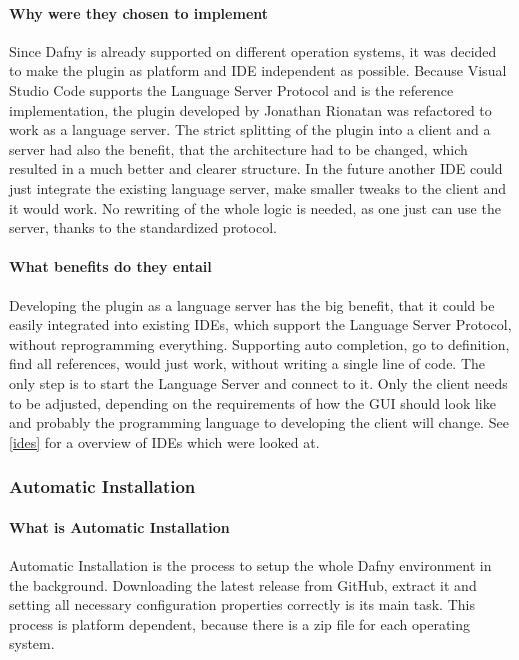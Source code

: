 \paragraph{Why were they chosen to implement}
Since Dafny is already supported on different operation systems, it was decided to make the plugin as platform and IDE independent as possible. Because Visual Studio Code supports the Language Server Protocol and is the reference implementation, the plugin developed by Jonathan Rionatan was refactored to work as a language server. The strict splitting of the plugin into a client and a server had also the benefit, that the architecture had to be changed, which resulted in a much better and clearer structure. \newline
In the future another IDE could just integrate the existing language server, make smaller tweaks to the client and it would work. No rewriting of the whole logic is needed, as one just can use the server, thanks to the standardized protocol. 
\paragraph{What benefits do they entail}
Developing the plugin as a language server has the big benefit, that it could be easily integrated into existing IDEs, which support the Language Server Protocol, without reprogramming everything. Supporting auto completion, go to definition, find all references, would just work, without writing a single line of code. The only step is to start the Language Server and connect to it. Only the client needs to be adjusted, depending on the requirements of how the GUI should look like and probably the programming language to developing the client will change. 
See \ref{ides} for a overview of IDEs which were looked at. 
\subsubsection{Automatic Installation} \label{setupAutomaticInstallation}
\paragraph{What is Automatic Installation}
Automatic Installation is the process to setup the whole Dafny environment in the background. Downloading the latest release from GitHub, extract it and setting all necessary configuration properties correctly is its main task. This process is platform dependent, because there is a zip file for each operating system. 

